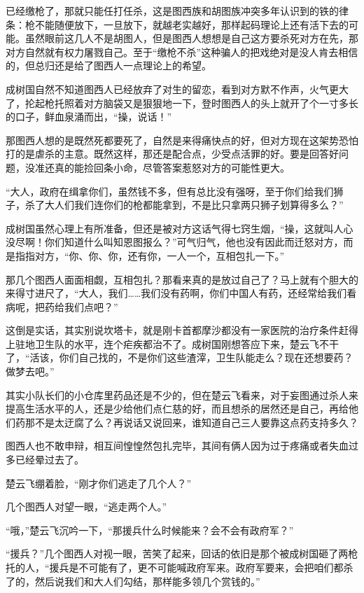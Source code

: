 已经缴枪了，那就只能任打任杀，这是图西族和胡图族冲突多年认识到的铁的律条：枪不能随便放下，一旦放下，就越老实越好，那样起码理论上还有活下去的可能。虽然眼前这几人不是胡图人，但是图西人想想是自己这方要杀死对方在先，那对方自然就有权力屠戮自己。至于“缴枪不杀”这种骗人的把戏绝对是没人肯去相信的，但总归还是给了图西人一点理论上的希望。

成树国自然不知道图西人已经放弃了对生的留恋，看到对方默不作声，火气更大了，抡起枪托照着对方脑袋又是狠狠地一下，登时图西人的头上就开了个一寸多长的口子，鲜血泉涌而出，“操，说话！”

那图西人想的是既然死都要死了，自然是来得痛快点的好，但对方现在这架势恐怕打的是虐杀的主意。既然这样，那还是配合点，少受点活罪的好。要是回答好问题，没准还真的能捡回条小命，尽管答案惹怒对方的可能性更大。

“大人，政府在缉拿你们，虽然钱不多，但有总比没有强呀，至于你们给我们狮子，杀了大人们我们连你们的枪都能拿到，不是比只拿两只狮子划算得多么？”

成树国虽然心理上有所准备，但还是被对方这话气得七窍生烟，“操，这就叫人心没尽啊！你们知道什么叫知恩图报么？”可气归气，他也没有因此而迁怒对方，而是指指对方，“你、你、你，还有你，一人一个，互相包扎一下。”

那几个图西人面面相觑，互相包扎？那看来真的是放过自己了？马上就有个胆大的来得寸进尺了，“大人，我们……我们没有药啊，你们中国人有药，还经常给我们看病呢，把药给我们点吧？”

这倒是实话，其实别说坎塔卡，就是刚卡首都摩沙都没有一家医院的治疗条件赶得上驻地卫生队的水平，连个疟疾都治不了。成树国刚想答应下来，楚云飞不干了，“活该，你们自己找的，不是你们这些渣滓，卫生队能走么？现在还想要药？做梦去吧。”

其实小队长们的小仓库里药品还是不少的，但在楚云飞看来，对于妄图通过杀人来提高生活水平的人，还是少给他们点仁慈的好，而且想杀的居然还是自己，再给他们药那不是太迂腐了么？再说话又说回来，谁知道自己三人要靠这点药支持多久？

图西人也不敢申辩，相互间惶惶然包扎完毕，其间有俩人因为过于疼痛或者失血过多已经晕过去了。

楚云飞绷着脸，“刚才你们逃走了几个人？”

几个图西人对望一眼，“逃走两个人。”

“哦，”楚云飞沉吟一下，“那援兵什么时候能来？会不会有政府军？”

“援兵？”几个图西人对视一眼，苦笑了起来，回话的依旧是那个被成树国砸了两枪托的人，“援兵是不可能有了，更不可能喊政府军来。政府军要来，会把咱们都杀了的，然后说我们和大人们勾结，那样能多领几个赏钱的。”

